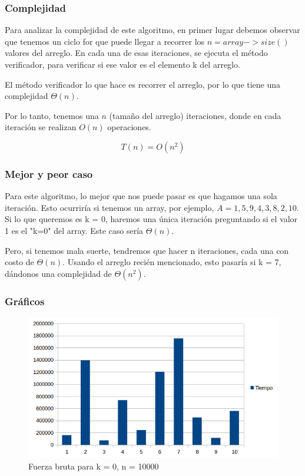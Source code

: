 \subsubsection{Complejidad}
Para analizar la complejidad de este algoritmo, en primer lugar debemos observar que tenemos un ciclo for que puede llegar a recorrer los $n = array->size()$ valores del arreglo. En cada una de esas iteraciones, se ejecuta el método verificador, para verificar si ese valor es el elemento k del arreglo.

El método verificador lo que hace es recorrer el arreglo, por lo que tiene una complejidad $\Theta(n)$.

Por lo tanto, tenemos una $n$ (tamaño del arreglo) iteraciones, donde en cada iteración se realizan $O(n)$ operaciones.

$$ T(n) = O(n^2) $$

\subsubsection{Mejor y peor caso}
Para este algoritmo, lo mejor que nos puede pasar es que hagamos una sola iteración. Esto ocurriría si tenemos un array, por ejemplo, $ A = { 1, 5, 9, 4, 3, 8, 2, 10} $.
Si lo que queremos es k = 0, haremos una única iteración preguntando si el valor 1 es el "k=0" del array. Este caso sería $\Theta(n)$.

Pero, si tenemos mala suerte, tendremos que hacer n iteraciones, cada una con costo de $\Theta(n)$.
Usando el arreglo recién mencionado, esto pasaría si k = 7, dándonos una complejidad de $\Theta(n^2)$.

\subsubsection{Gráficos}
\begin{figure}[H]
\centering
\includegraphics[width=\textwidth]{KZero/BruteForceK0.png}
\caption{Fuerza bruta para k = 0, n = 10000}
\end{figure}

